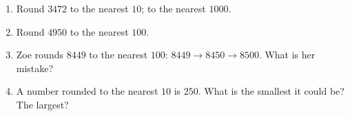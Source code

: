 \documentclass{beamer}
\newcommand{\ashow}[1]{\uncover<2->{\textcolor{red}{\small #1}}}
\begin{document}
\begin{frame}
\begin{columns}[T]
\begin{multicols}{2}
\begin{enumerate}
  \item Round $3472$ to the nearest $10$; to the nearest $1000$. \ashow{$3470$ and $3000$}

  \columnbreak

  \item Round $4950$ to the nearest $100$. \ashow{$5000$}

  \item Zoe rounds $8449$ to the nearest $100$: $8449\to 8450\to 8500$. What is her mistake? \ashow{Rounded twice: only the tens digit $4$ counts, so $8400$}

  \item A number rounded to the nearest $10$ is $250$. What is the smallest it could be? The largest? \ashow{$245$ and $254$}

\end{enumerate}
\end{multicols}

\end{columns}

\end{frame}
\end{document}
